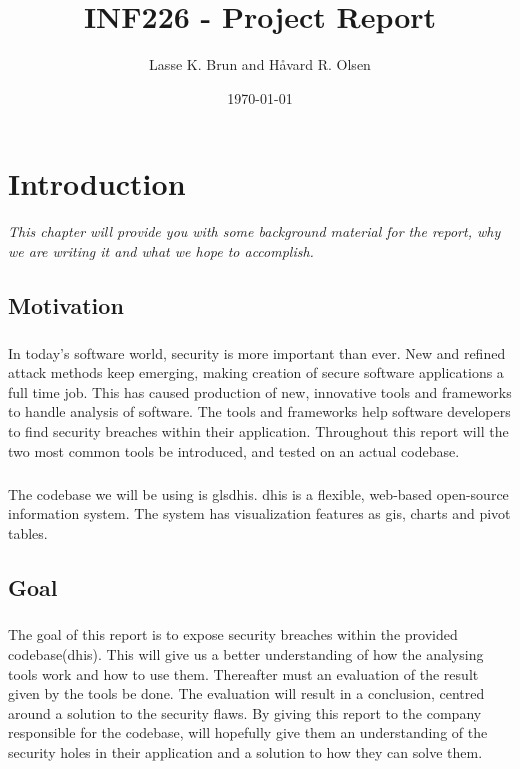 \documentclass[11pt,english,a4paper]{report}
\title{INF226 - Project Report}
\date{\today}
\author{Lasse K. Brun and Håvard R. Olsen}
\begin{document}
\maketitle

\tableofcontents
\newpage

\printglossaries
\newpage


\chapter{Introduction}
\textit{This chapter will provide you with some background material for the report, why we are writing it and what we hope to accomplish.}

\section{Motivation}
\paragraph{}
In today's software world, security is more important than ever. 
New and refined attack methods keep emerging, making creation of secure software applications a full time job. 
This has caused production of new, innovative tools and frameworks to handle analysis of software. 
The tools and frameworks help software developers to find security breaches within their application. 
Throughout this report will the two most common tools be introduced, and tested on an actual codebase.

\paragraph{}
The codebase we will be using is gls{dhis}. \gls{dhis} is a flexible, web-based open-source information system. 
The system has visualization features as \gls{gis}, charts and pivot tables. \cite{dhis2-homepage}


\section{Goal}
\paragraph{}
The goal of this report is to expose security breaches within the provided codebase(\gls{dhis}). 
This will give us a better understanding of how the analysing tools work and how to use them. 
Thereafter must an evaluation of the result given by the tools be done. 
The evaluation will result in a conclusion, centred around a solution to the security flaws. 
By giving this report to the company responsible for the codebase, will hopefully give them an understanding of the security holes in their application and a solution to how they can solve them.
\end{document}
